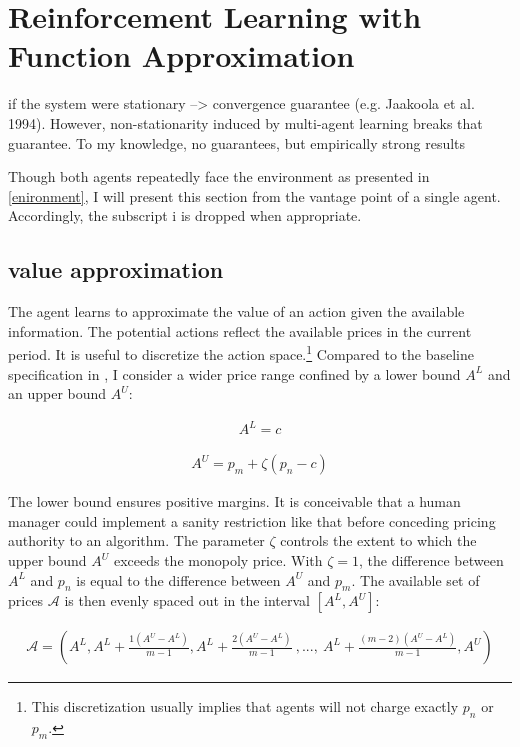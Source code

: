 \section{Reinforcement Learning with Function Approximation}

if the system were stationary --> convergence guarantee (e.g. Jaakoola et al. 1994). However, non-stationarity induced by multi-agent learning breaks that guarantee. To my knowledge, no guarantees, but empirically strong results

Though both agents repeatedly face the environment as presented in \autoref{enironment}, I will present this section from the vantage point of a single agent. Accordingly, the subscript {i} is dropped when appropriate.

\subsection{value approximation}\label{value_approximation}

The agent learns to approximate the value of an action given the available information. The potential actions reflect the available prices in the current period. It is useful to discretize the action space.\footnote{This discretization usually implies that agents will not charge exactly $p_n$ or $p_m$.} Compared to the baseline specification in \textcite{calvano_artificial_2019}, I consider a wider price range confined by a lower bound $A^L$ and an upper bound $A^U$:

\begin{gather}
A^{L} = c
\end{gather}

\begin{gather}
A^{U} = p_m + \zeta (p_n - c)
\end{gather}

The lower bound ensures positive margins. It is conceivable that a human manager could implement a sanity restriction like that before conceding pricing authority to an algorithm. The parameter $\zeta$ controls the extent to which the upper bound $A^U$ exceeds the monopoly price. With $\zeta = 1$, the difference between $A^{L}$ and $p_n$ is equal to the difference between $A^{U}$ and $p_m$. The available set of prices $\mathcal{A}$ is then evenly spaced out in the interval $[A^L, A^U]$:

\begin{gather}
	\mathcal{A} = (A^L, A^L + \frac{1(A^U - A^L)}{m-1}, A^L + \frac{2(A^U - A^L)}{m-1}~ , ... , ~ A^L + \frac{(m-2)(A^U - A^L)}{m-1}, A^U)
\end{gather}

